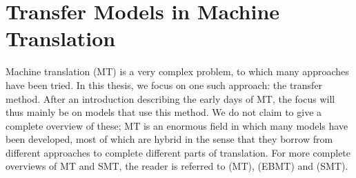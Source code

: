 \documentclass{report}
\theoremstyle{definition}
\theoremstyle{plain}
\begin{document}

\chapter{Transfer Models in Machine Translation}



Machine translation (MT) is a very complex problem, to which many approaches have been tried. In this thesis, we focus on one such approach: the transfer method.   After an introduction describing the early days of MT, the focus will thus mainly be on models that use this method. We do not claim to give a complete overview of these; MT is an enormous field in which many models have been developed, most of which are hybrid in the sense that they borrow from different approaches to complete different parts of translation. For more complete overviews of MT and SMT, the reader is referred to \cite{hutchins1992introduction} (MT), \cite{somers1999review} (EBMT) and \cite{koehn2008statistical} (SMT).
\end{document}
